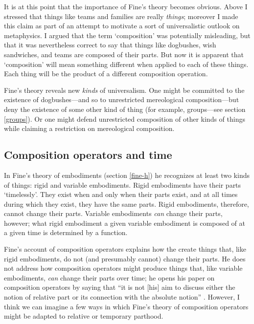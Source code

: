\documentclass[11pt]{article}
\begin{document}
\begin{spacing}{1.5}
It is at this point that the importance of Fine's theory becomes
obvious.  Above I stressed that things like teams and families are
really {\em things}; moreover I made this claim as part of an attempt
to motivate a sort of universalistic outlook on metaphysics.  I argued
that the term `composition' was potentially misleading, but that it
was nevertheless correct to say that things like dogbushes, wish
sandwiches, and teams are composed of their parts.  But now it is
apparent that `composition' will mean something different when applied
to each of these things.  Each thing will be the product of a
different composition operation.

Fine's theory reveals new {\em kinds} of universalism.  One might be
committed to the existence of dogbushes---and so to unrestricted
mereological composition---but deny the existence of some other kind
of thing (for example, groups---see section \ref{groups}).  Or one
might defend unrestricted composition of other kinds of things while
claiming a restriction on mereological composition.

\subsection{Composition operators and time}
\label{c-change}
In Fine's theory of embodiments (section \ref{fine-h}) he recognizes
at least two kinds of things: rigid and variable embodiments.  Rigid
embodiments have their parts `timelessly'.  They exist when and only
when their parts exist, and at all times during which they exist, they
have the same parts.  Rigid embodiments, therefore, cannot change
their parts.  Variable embodiments {\em can} change their parts,
however; what rigid embodiment a given variable embodiment is composed
of at a given time is determined by a function.

Fine's account of composition operators explains how the create things
that, like rigid embodiments, do not (and presumably cannot) change
their parts.  He does not address how composition operators might
produce things that, like variable embodiments, {\em can} change their
parts over time; he opens his paper on composition operators by saying
that ``it is not [his] aim to discuss either the notion of relative
part or its connection with the absolute notion''
\citeyearpar[559]{fine2010}.  However, I think we can imagine a few
ways in which Fine's theory of composition operators might be adapted
to relative or temporary parthood.


\end{spacing}
\end{document}
